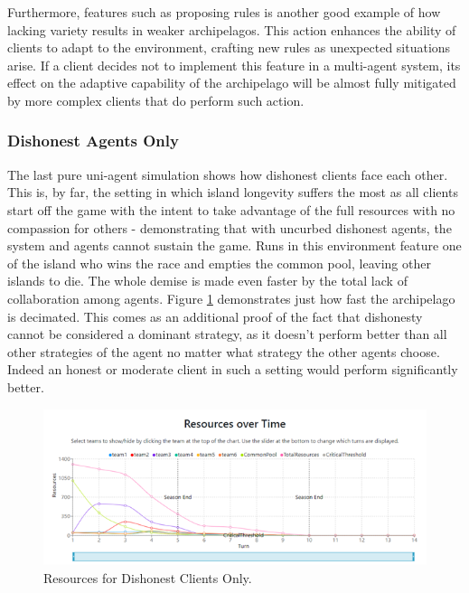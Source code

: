 Furthermore, features such as proposing rules is another good example of how lacking variety results in weaker archipelagos. This action enhances the ability of clients to adapt to the environment, crafting new rules as unexpected situations arise. If a client decides not to implement this feature in a multi-agent system, its effect on the adaptive capability of the archipelago will be almost fully mitigated by more complex clients that do perform such action.

\subsubsection{Dishonest Agents Only} \label{dishonestAD}
The last pure uni-agent simulation shows how dishonest clients face each other. This is, by far, the setting in which island longevity suffers the most as all clients start off the game with the intent to take advantage of the full resources with no compassion for others - demonstrating that with uncurbed dishonest agents, the system and agents cannot sustain the game. Runs in this environment feature one of the island who wins the race and empties the common pool, leaving other islands to die. The whole demise is made even faster by the total lack of collaboration among agents. Figure \ref{fig:ResourcesDD} demonstrates just how fast the archipelago is decimated. This comes as an additional proof of the fact that dishonesty cannot be considered a dominant strategy, as it doesn't perform better than all other strategies of the agent no matter what strategy the other agents choose. Indeed an honest or moderate client in such a setting would perform significantly better.
\begin{figure}[H]
\centering
\includegraphics[scale=0.8]{12_team4_agentdesign/images/ResourcesDD.png}
\caption{Resources for Dishonest Clients Only.}
\label{fig:ResourcesDD}
\end{figure}

